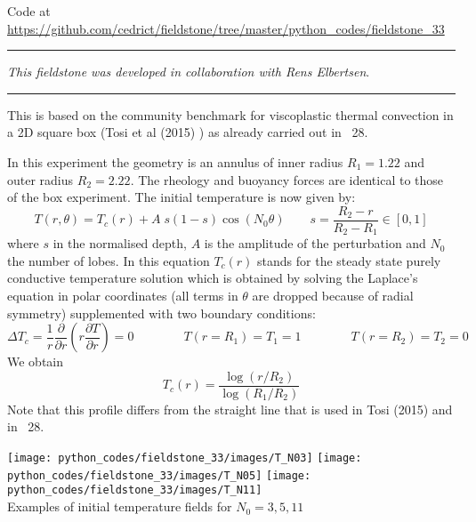 

\begin{center}
Code at \url{https://github.com/cedrict/fieldstone/tree/master/python_codes/fieldstone_33}
\end{center}

\par\noindent\rule{\textwidth}{0.4pt}

{\sl This fieldstone was developed in collaboration with Rens Elbertsen}. 

\par\noindent\rule{\textwidth}{0.4pt}



This is based on the community benchmark for viscoplastic thermal convection
in a 2D square box (Tosi et al (2015) \cite{tosn15}) as already carried out in \stone~28.

In this experiment the geometry is an annulus of inner radius 
$R_1=1.22$ and outer radius $R_2=2.22$. 
The rheology and buoyancy forces are identical to those of the box 
experiment. The initial temperature is now given by:
\[
T(r,\theta) = T_c(r)+A\; s(1-s) \cos(N_0 \theta)
\quad\quad s=\frac{R_2-r}{R_2-R_1} \in [0,1]
\]
where $s$ in the normalised depth, $A$ is the amplitude of the perturbation and $N_0$ the 
number of lobes. In this equation $T_c(r)$ stands for the steady state purely conductive 
temperature solution which is obtained by solving the Laplace's equation in 
polar coordinates (all terms in $\theta$ are dropped because of radial symmetry) 
supplemented with two boundary conditions:
\[
\Delta T_c = \frac{1}{r}\frac{\partial }{\partial r} \left( r \frac{\partial T}{\partial r} \right) =0 
\quad\quad
\quad\quad
T(r=R_1)=T_1=1
\quad\quad
\quad\quad
T(r=R_2)=T_2=0
\]
We obtain 
\[
T_c(r)=\frac{\log (r/R_2)}{\log(R_1/R_2)}
\]
Note that this profile differs from the straight line that is used in Tosi \etal (2015) \cite{tosn15} 
and in \stone~28.

\begin{center}
\texttt{[image: python\_codes/fieldstone\_33/images/T\_N03]}
\texttt{[image: python\_codes/fieldstone\_33/images/T\_N05]}
\texttt{[image: python\_codes/fieldstone\_33/images/T\_N11]}\\
{\captionfont Examples of initial temperature fields for $N_0=3,5,11$}
\end{center}

